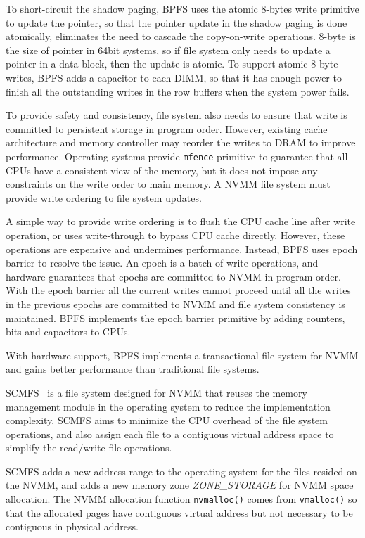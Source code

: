 To short-circuit the shadow paging, BPFS uses the atomic 8-bytes write primitive
to update the pointer, so that the pointer update in the shadow paging is done
atomically, eliminates the need to cascade the copy-on-write operations.
8-byte is the size of pointer in 64bit systems, so if file system only needs to
update a pointer in a data block, then the update is atomic. To support
atomic 8-byte writes, BPFS adds a capacitor to each DIMM, so that it has enough
power to finish all the outstanding writes in the row buffers when the system
power fails.

To provide safety and consistency, file system also needs to ensure that write
is committed to persistent storage in program order. However, existing cache
architecture and memory controller may reorder the writes to DRAM to improve
performance. Operating systems provide \texttt{mfence} primitive to guarantee
that all CPUs have a consistent view of the memory, but it does not impose
any constraints on the write order to main memory. A NVMM file system must
provide write ordering to file system updates.

A simple way to provide write ordering is to flush the CPU cache line after
write operation, or uses write-through to bypass CPU cache directly. However,
these operations are expensive and undermines performance. Instead, BPFS uses
epoch barrier to resolve the issue. An epoch is a batch of write operations,
and hardware guarantees that epochs are committed to NVMM in program order.
With the epoch barrier all the current writes cannot proceed until all the
writes in the previous epochs are committed to NVMM and file system consistency
is maintained. BPFS implements the epoch barrier primitive by adding counters,
bits and capacitors to CPUs.

With hardware support, BPFS implements a transactional file system for NVMM
and gains better performance than traditional file systems.

SCMFS~\cite{scmfs} is a file system designed for NVMM that reuses the memory
management module in the operating system to reduce the implementation
complexity. SCMFS aims to minimize the CPU overhead of the file system
operations, and also assign each file to a contiguous virtual address space
to simplify the read/write file operations.

SCMFS adds a new address range to the operating system for the files resided
on the NVMM, and 
adds a new memory zone \emph{ZONE\_STORAGE} for NVMM space allocation. The
NVMM allocation function \texttt{nvmalloc()} comes from \texttt{vmalloc()}
so that the allocated pages have contiguous virtual address but not necessary
to be contiguous in physical address.

